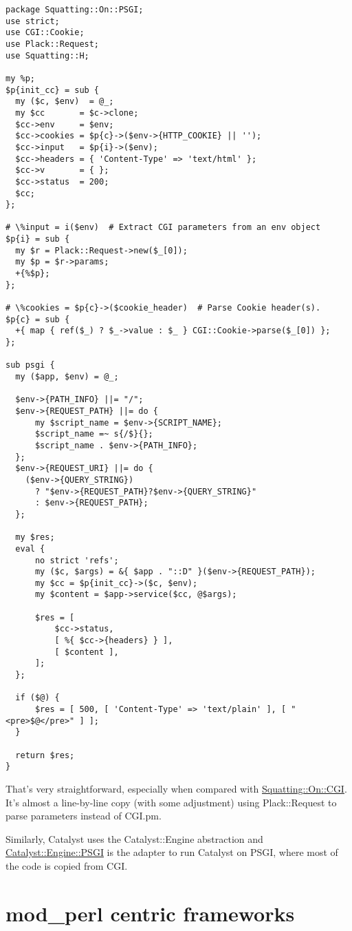 \begin{lstlisting}
package Squatting::On::PSGI;
use strict;
use CGI::Cookie;
use Plack::Request;
use Squatting::H;

my %p;
$p{init_cc} = sub {
  my ($c, $env)  = @_;
  my $cc       = $c->clone;
  $cc->env     = $env;
  $cc->cookies = $p{c}->($env->{HTTP_COOKIE} || '');
  $cc->input   = $p{i}->($env);
  $cc->headers = { 'Content-Type' => 'text/html' };
  $cc->v       = { };
  $cc->status  = 200;
  $cc;
};

# \%input = i($env)  # Extract CGI parameters from an env object
$p{i} = sub {
  my $r = Plack::Request->new($_[0]);
  my $p = $r->params;
  +{%$p};
};

# \%cookies = $p{c}->($cookie_header)  # Parse Cookie header(s).
$p{c} = sub {
  +{ map { ref($_) ? $_->value : $_ } CGI::Cookie->parse($_[0]) };
};

sub psgi {
  my ($app, $env) = @_;

  $env->{PATH_INFO} ||= "/";
  $env->{REQUEST_PATH} ||= do {
      my $script_name = $env->{SCRIPT_NAME};
      $script_name =~ s{/$}{};
      $script_name . $env->{PATH_INFO};
  };
  $env->{REQUEST_URI} ||= do {
    ($env->{QUERY_STRING})
      ? "$env->{REQUEST_PATH}?$env->{QUERY_STRING}"
      : $env->{REQUEST_PATH};
  };

  my $res;
  eval {
      no strict 'refs';
      my ($c, $args) = &{ $app . "::D" }($env->{REQUEST_PATH});
      my $cc = $p{init_cc}->($c, $env);
      my $content = $app->service($cc, @$args);

      $res = [
          $cc->status,
          [ %{ $cc->{headers} } ],
          [ $content ],
      ];
  };

  if ($@) {
      $res = [ 500, [ 'Content-Type' => 'text/plain' ], [ "<pre>$@</pre>" ] ];
  }

  return $res;
}
\end{lstlisting}

That's very straightforward, especially when compared with
\href{http://cpansearch.perl.org/src/BEPPU/Squatting-0.70/lib/Squatting/On/CGI.pm}{Squatting::On::CGI}.
It's almost a line-by-line copy (with some adjustment) using
Plack::Request to parse parameters instead of CGI.pm.

Similarly, Catalyst uses the Catalyst::Engine abstraction and
\href{http://search.cpan.org/perldoc?Catalyst::Engine::PSGI}{Catalyst::Engine::PSGI}
is the adapter to run Catalyst on PSGI, where most of the code is copied
from CGI.

\section{mod\_perl centric
frameworks}\label{modux5fperl-centric-frameworks}

